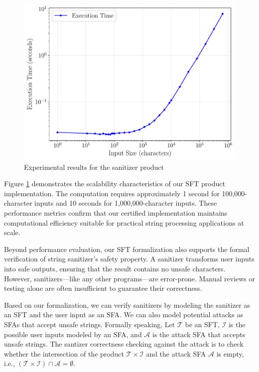 \begin{figure}
\centering
\includegraphics[scale=0.45]{benchmark_loglog.pdf}
\caption{Experimental results for the sanitizer product}
\label{fig:benchmark-results}
\end{figure}

Figure \ref{fig:benchmark-results} demonstrates the scalability characteristics of our SFT product implementation. The computation requires approximately 1 second for 100,000-character inputs and 10 seconds for 1,000,000-character inputs. These performance metrics confirm that our certified implementation maintains computational efficiency suitable for practical string processing applications at scale.

Beyond performance evaluation, our SFT formalization also supports the formal verification of string sanitizer's safety property. A sanitizer transforms user inputs into safe outputs, ensuring that the result contains no unsafe characters. However, sanitizers—like any other programs—are error-prone. Manual reviews or testing alone are often insufficient to guarantee their correctness.

Based on our formalization, we can verify sanitizers by modeling the sanitizer as an SFT and the user input as an SFA. We can also model potential attacks as SFAs that accept unsafe strings. Formally speaking, Let $\mathcal{T}$ be an SFT, $\mathcal{I}$ is the possible user inputs modeled by an SFA, and $\mathcal{A}$ is the attack SFA that accepts unsafe strings. The santizer correctness checking against the attack is to check whether the intersection of the product $\mathcal{T} \times \mathcal{I}$ and the attack SFA $\mathcal{A}$ is empty, i.e., $(\mathcal{T} \times \mathcal{I}) \cap \mathcal{A} = \emptyset$.

